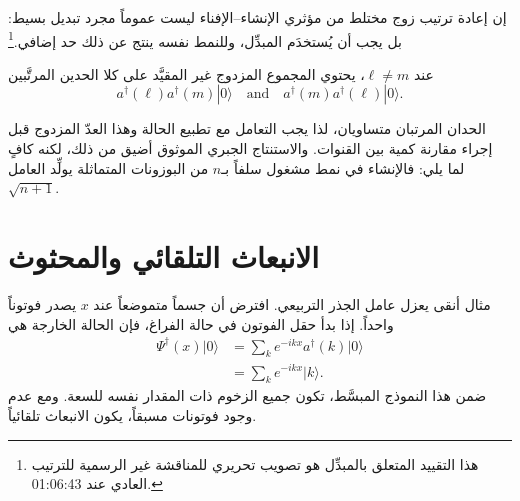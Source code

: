 إن إعادة ترتيب زوج مختلط من مؤثري الإنشاء--الإفناء ليست عموماً مجرد تبديل بسيط: بل يجب أن يُستخدَم المبدِّل، وللنمط نفسه ينتج عن ذلك حد إضافي.\footnote{هذا التقييد المتعلق بالمبدِّل هو تصويب تحريري للمناقشة غير الرسمية للترتيب العادي عند 01:06:43.}

\begin{classroomqa}
\end{classroomqa}

عند \(\ell\ne m\)، يحتوي المجموع المزدوج غير المقيَّد على كلا الحدين المرتَّبين
\begin{equation}
a^\dagger(\ell)a^\dagger(m)|0\rangle
\quad\text{and}\quad
a^\dagger(m)a^\dagger(\ell)|0\rangle.
\end{equation}

\begin{classroomqa}
\end{classroomqa}

الحدان المرتبان متساويان، لذا يجب التعامل مع تطبيع الحالة وهذا العدّ المزدوج قبل إجراء مقارنة كمية بين القنوات. والاستنتاج الجبري الموثوق أضيق من ذلك، لكنه كافٍ لما يلي: فالإنشاء في نمط مشغول سلفاً بـ\(n\) من البوزونات المتماثلة يولِّد العامل \(\sqrt{n+1}\).

\section{الانبعاث التلقائي والمحثوث}

مثال أنقى يعزل عامل الجذر التربيعي. افترض أن جسماً متموضعاً عند \(x\) يصدر فوتوناً واحداً. إذا بدأ حقل الفوتون في حالة الفراغ، فإن الحالة الخارجة هي
\begin{align}
\Psi^\dagger(x)|0\rangle
&=\sum_k e^{-ikx}a^\dagger(k)|0\rangle\\
&=\sum_k e^{-ikx}|k\rangle.
\end{align}
ضمن هذا النموذج المبسَّط، تكون جميع الزخوم ذات المقدار نفسه للسعة. ومع عدم وجود فوتونات مسبقاً، يكون الانبعاث تلقائياً.

